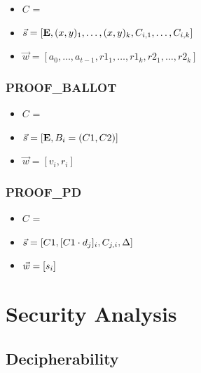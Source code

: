 \documentclass{article}
\begin{document}
\begin{itemize}
    \item $C$ = \ProofFDKGInformal{}

    \item $\vec{s}=[\textbf{E}{}, (x,y)_1,\dots,(x,y)_k, C_{i,1},\dots, C_{i,k}]$
    
    \item $\vec{w}=[a_0, \dots, a_{t-1}, r1_1,\dots,r1_k, r2_1,\dots,r2_k]$
\end{itemize}

\subsubsection{\textrm{PROOF}_\textrm{BALLOT}}\label{sec:proof-ballot}

\begin{itemize}
    \item $C$ = \ProofBALLOTInformal{}
    
    \item $\vec{s}=[\textbf{E}{}, B_{i} = (C1, C2)]$
    
    \item $\vec{w}=[v_i, r_i]$
\end{itemize}

\subsubsection{\textrm{PROOF}_\textrm{PD}}\label{sec:proof-pd}


\begin{itemize}
    \item $C$ = \ProofPDInformal{}
    
    \item $\vec{s}=[C1, [C1 \cdot d_{j}]_{i}, C_{j,i}, \Delta]$
    
    \item $\vec{w}=[s_{i}]$
\end{itemize}


\section{Security Analysis}


\subsection*{Decipherability}
\end{document}
